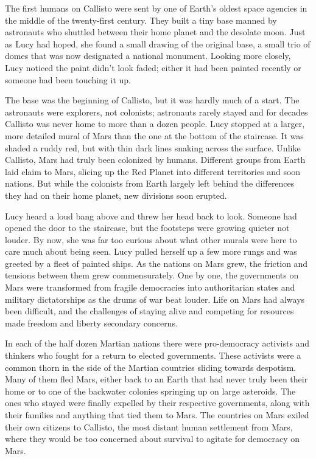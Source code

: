 \documentclass[12pt]{article} %
\begin{document}
The first humans on Callisto were sent by one of Earth's oldest space agencies in the middle of the twenty-first century. They built a tiny base manned by astronauts who shuttled between their home planet and the desolate moon. Just as Lucy had hoped, she found a small drawing of the original base, a small trio of domes that was now designated a national monument. Looking more closely, Lucy noticed the paint didn't look faded; either it had been painted recently or someone had been touching it up. 

The base was the beginning of Callisto, but it was hardly much of a start. The astronauts were explorers, not colonists; astronauts rarely stayed and for decades Callisto was never home to more than a dozen people. Lucy stopped at a larger, more detailed mural of Mars than the one at the bottom of the staircase. It was shaded a ruddy red, but with thin dark lines snaking across the surface. Unlike Callisto, Mars had truly been colonized by humans. Different groups from Earth laid claim to Mars, slicing up the Red Planet into different territories and soon nations. But while the colonists from Earth largely left behind the differences they had on their home planet, new divisions soon erupted.

Lucy heard a loud bang above and threw her head back to look. Someone had opened the door to the staircase, but the footsteps were growing quieter not louder. By now, she was far too curious about what other murals were here to care much about being seen. Lucy pulled herself up a few more rungs and was greeted by a fleet of painted ships. As the nations on Mars grew, the friction and tensions between them grew commensurately. One by one, the governments on Mars were transformed from fragile democracies into authoritarian states and military dictatorships as the drums of war beat louder. Life on Mars had always been difficult, and the challenges of staying alive and competing for resources made freedom and liberty secondary concerns.

In each of the half dozen Martian nations there were pro-democracy activists and thinkers who fought for a return to elected governments. These activists were a common thorn in the side of the Martian countries sliding towards despotism. Many of them fled Mars, either back to an Earth that had never truly been their home or to one of the backwater colonies springing up on large asteroids. The ones who stayed were finally expelled by their respective governments, along with their families and anything that tied them to Mars. The countries on Mars exiled their own citizens to Callisto, the most distant human settlement from Mars, where they would be too concerned about survival to agitate for democracy on Mars.
\end{document}
